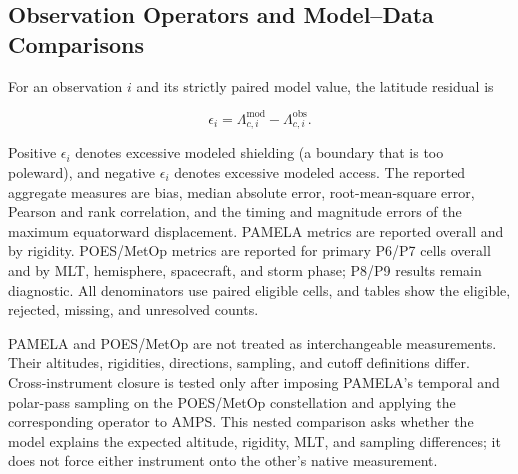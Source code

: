 \subsection{Observation Operators and Model--Data Comparisons}

For an observation $i$ and its strictly paired model value, the latitude
residual is
\begin{linenomath*}
\begin{equation}
 \epsilon_i=\Lambda_{c,i}^{\mathrm{mod}}-
             \Lambda_{c,i}^{\mathrm{obs}}.
 \label{eq:exp-residual}
\end{equation}
\end{linenomath*}
Positive $\epsilon_i$ denotes excessive modeled shielding (a boundary that is
too poleward), and negative $\epsilon_i$ denotes excessive modeled access. The
reported aggregate measures are bias, median absolute error, root-mean-square
error, Pearson and rank correlation, and the timing and magnitude errors of
the maximum equatorward displacement. PAMELA metrics are reported overall and
by rigidity. POES/MetOp metrics are reported for primary P6/P7 cells overall
and by MLT, hemisphere, spacecraft, and storm phase; P8/P9 results remain
diagnostic. All denominators use paired eligible cells, and tables show the
eligible, rejected, missing, and unresolved counts.

PAMELA and POES/MetOp are not treated as interchangeable measurements. Their
altitudes, rigidities, directions, sampling, and cutoff definitions differ.
Cross-instrument closure is tested only after imposing PAMELA's temporal and
polar-pass sampling on the POES/MetOp constellation and applying the
corresponding operator to AMPS. This nested comparison asks whether the model
explains the expected altitude, rigidity, MLT, and sampling differences; it
does not force either instrument onto the other's native measurement.

